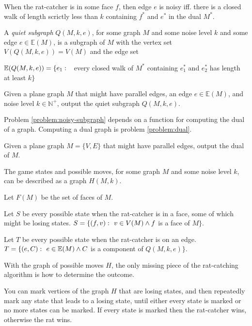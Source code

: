 \documentclass{article}
\begin{document}
		\begin{definition}\label{def:face-quiet}
			When the rat-catcher is in some face $f$, then edge $e$ is noisy iff. there is a closed walk of length scrictly less than $k$ containing $f^*$ and $e^*$ in the dual $M^*$.
		\end{definition}

		A \textit{quiet subgraph} $Q(M, k, e)$, for some graph $M$ and some noise level $k$ and some edge $e \in \mathbb{E}(M)$, is a subgraph of $M$ with the vertex set $V(Q(M, k, e)) = V(M)$ and the edge set

		$\mathbb{E}(Q(M, k, e)) = \{e_1 \,\colon\  $ every closed walk of $M^*$ containing $e_1^*$ and $e_2^*$ has length at least $k\}$

		\begin{problem}\label{problem:noisy-subgraph}
			Given a plane graph $M$ that might have parallel edges, an edge $e \in \mathbb{E}(M)$, and noise level $k \in \mathbb{N}^+$, output the quiet subgraph $Q(M, k, e)$.
		\end{problem}

		Problem \ref{problem:noisy-subgraph} depends on a function for computing the dual of a graph. Computing a dual graph is problem \ref{problem:dual}.

		\begin{problem}\label{problem:dual}
			Given a plane graph $M = \{V, E\}$ that might have parallel edges, output the dual of $M$.
		\end{problem}

		The game states and possible moves, for some graph $M$ and some noise level $k$, can be described as a graph $H(M, k)$.

		Let $F(M)$ be the set of faces of $M$.

		Let $S$ be every possible state when the rat-catcher is in a face, some of which might be losing states. $S = \{ (f, v) \,\colon\  v \in V(M) \land f$ is a face of $ M \}$.

		Let $T$ be every possible state when the rat-catcher is on an edge. $T = \{ (e, C) \,\colon\  e \in \mathbb{E}(M) \land C$ is a component of $Q(M, k, e) \}$.
		
		With the graph of possible moves $H$, the only missing piece of the rat-catching algorithm is how to determine the outcome.

		You can mark vertices of the graph $H$ that are losing states, and then repeatedly mark any state that leads to a losing state, until either every state is marked or no more states can be marked. If every state is marked then the rat-catcher wins, otherwise the rat wins.
\end{document}
